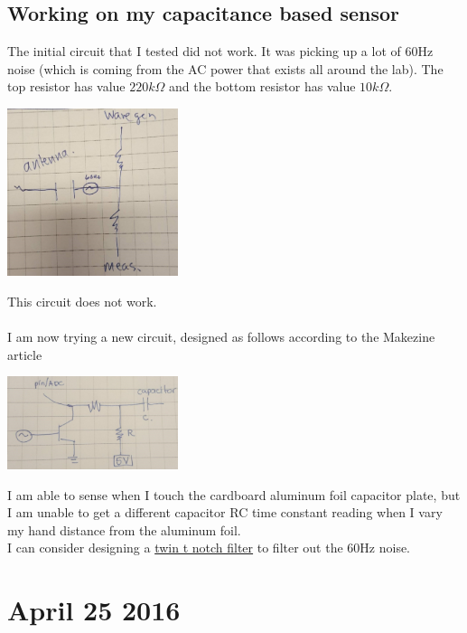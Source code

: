 \documentclass[12pt,twoside]{article}
\begin{document}
\subsection{Working on my capacitance based sensor}
The initial circuit that I tested did not work. It was picking up a lot of 60Hz noise (which is coming from the AC power that exists all around the lab). The top resistor has value $220k\Omega$ and the bottom resistor has value $10k\Omega$. 
\begin{center} \includegraphics[width = 50mm]{Pics/4-24a.jpg}  \end{center} %
This circuit does not work.
\\ 
\\ I am now trying a new circuit, designed as follows according to the Makezine article
\begin{center} \includegraphics[width = 50mm]{Pics/4-24c.jpg}  \end{center}
I am able to sense when I touch the cardboard aluminum foil capacitor plate, but I am unable to get a different capacitor RC time constant reading when I vary my hand distance from the aluminum foil. 
\\ I can consider designing a \href{http://www.radio-electronics.com/info/circuits/rc_notch_filter/twin_t_notch_filter.php}{twin t notch filter} to filter out the 60Hz noise. 



\section{April 25 2016}
\end{document}

